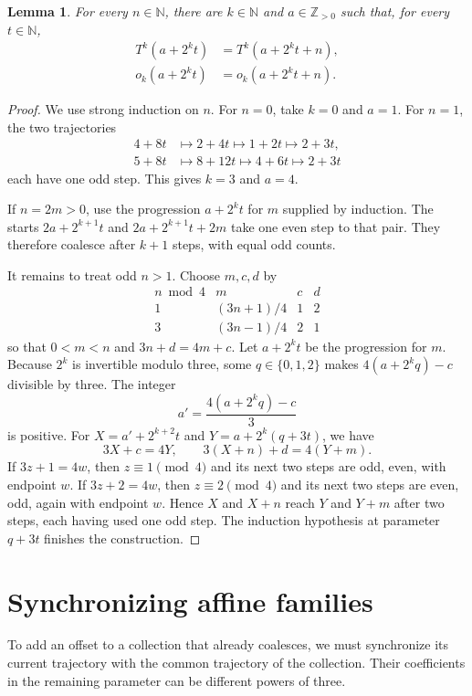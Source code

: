 \documentclass[11pt,a4paper]{article}
\newtheorem{lemma}[theorem]{Lemma}
\begin{document}
\begin{lemma}\label{lem:finite-pair}
For every $n\in\mathbb N$, there are $k\in\mathbb N$ and
$a\in\mathbb Z_{>0}$
such that, for every $t\in\mathbb N$,
\begin{align*}
T^k(a+2^kt)&=T^k(a+2^kt+n),\\
o_k(a+2^kt)&=o_k(a+2^kt+n).
\end{align*}
\end{lemma}
\begin{proof}
We use strong induction on $n$. For $n=0$, take $k=0$ and $a=1$.
For $n=1$, the two trajectories
\[
\begin{aligned}
4+8t&\longmapsto2+4t\longmapsto1+2t\longmapsto2+3t,\\
5+8t&\longmapsto8+12t\longmapsto4+6t\longmapsto2+3t
\end{aligned}
\]
each have one odd step. This gives $k=3$ and $a=4$.

If $n=2m>0$, use the progression $a+2^kt$ for $m$ supplied
by induction. The starts $2a+2^{k+1}t$ and
$2a+2^{k+1}t+2m$ take one even step to that pair. They therefore
coalesce after $k+1$ steps, with equal odd counts.

It remains to treat odd $n>1$. Choose $m,c,d$ by
\[
\begin{array}{c|ccc}
n\bmod4&m&c&d\\ \hline
1&(3n+1)/4&1&2\\
3&(3n-1)/4&2&1
\end{array}
\]
so that $0<m<n$ and $3n+d=4m+c$.
Let $a+2^kt$ be the progression for $m$.
Because $2^k$ is invertible modulo three, some
$q\in\{0,1,2\}$ makes $4(a+2^kq)-c$ divisible by three.
The integer
\[
a'=\frac{4(a+2^kq)-c}{3}
\]
is positive. For $X=a'+2^{k+2}t$ and
$Y=a+2^k(q+3t)$, we have
\[
3X+c=4Y,\qquad 3(X+n)+d=4(Y+m).
\]
If $3z+1=4w$, then $z\equiv1\pmod4$ and its next two
steps are odd, even, with endpoint $w$.
If $3z+2=4w$, then $z\equiv2\pmod4$ and its next two
steps are even, odd, again with endpoint $w$.
Hence $X$ and $X+n$ reach $Y$ and $Y+m$ after two steps,
each having used one odd step. The induction hypothesis at parameter
$q+3t$ finishes the construction.
\end{proof}

\section{Synchronizing affine families}

To add an offset to a collection that already coalesces, we must
synchronize its current trajectory with the common trajectory of the
collection. Their coefficients in the remaining parameter can be
different powers of three.
\end{document}
